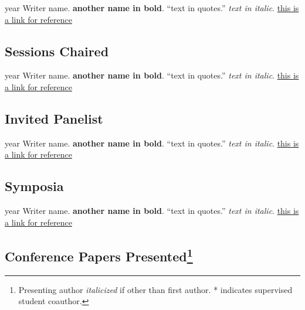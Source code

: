 \documentclass[12pt,letterpaper]{report}
\begin{document}
    \begin{tablist}

        \item[year] \tab{}Writer name. \textbf{another name in bold}. \enquote{text in quotes.} \textit{text in italic}. \href{https://this.is.a.link}{this is a link for reference}

    \end{tablist}

    \subsection*{Sessions Chaired}

    \begin{tablist}

        \item[year] \tab{}Writer name. \textbf{another name in bold}. \enquote{text in quotes.} \textit{text in italic}. \href{https://this.is.a.link}{this is a link for reference}

    \end{tablist}

    \subsection*{Invited Panelist}

    \begin{tablist}

        \item[year] \tab{}Writer name. \textbf{another name in bold}. \enquote{text in quotes.} \textit{text in italic}. \href{https://this.is.a.link}{this is a link for reference}

    \end{tablist}

    \subsection*{Symposia}

    \begin{tablist}

        \item[year] \tab{}Writer name. \textbf{another name in bold}. \enquote{text in quotes.} \textit{text in italic}. \href{https://this.is.a.link}{this is a link for reference}

    \end{tablist}

    \subsection*{Conference Papers Presented\footnote{Presenting author \textit{italicized} if other than first author. * indicates supervised student coauthor.}}
\end{document}
